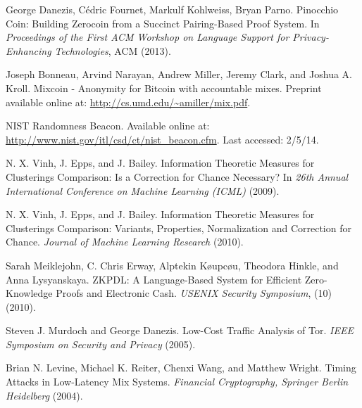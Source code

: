 \documentclass[conference]{IEEEtran}
\begin{document}
\begin{thebibliography}{1}
 George Danezis, C\'{e}dric Fournet, Markulf Kohlweiss, Bryan Parno. Pinocchio Coin: Building Zerocoin from a Succinct Pairing-Based Proof System. In \emph{Proceedings of the First ACM Workshop on Language Support for Privacy-Enhancing Technologies}, ACM (2013).

 Joseph Bonneau, Arvind Narayan, Andrew Miller, Jeremy Clark, and Joshua A. Kroll. Mixcoin - Anonymity for Bitcoin with accountable mixes. Preprint available online at: \url{http://cs.umd.edu/~amiller/mix.pdf}.

 NIST Randomness Beacon. Available online at: \url{http://www.nist.gov/itl/csd/ct/nist_beacon.cfm}. Last accessed: 2/5/14.

 N. X. Vinh, J. Epps, and J. Bailey. Information Theoretic Measures for Clusterings Comparison: Is a Correction for Chance Necessary? In \emph{26th Annual International Conference on Machine Learning (ICML)} (2009).

 N. X. Vinh, J. Epps, and J. Bailey. Information Theoretic Measures for Clusterings Comparison: Variants, Properties, Normalization and Correction for Chance. \emph{Journal of Machine Learning Research} (2010).

 Sarah Meiklejohn, C. Chris Erway, Alptekin K\o{u}pc\o{u}, Theodora Hinkle, and Anna Lysyanskaya. ZKPDL: A Language-Based System for Efficient Zero-Knowledge Proofs and Electronic Cash. \emph{USENIX Security Symposium}, (10) (2010).

 Steven J. Murdoch and George Danezis. Low-Cost Traffic Analysis of Tor. \emph{IEEE Symposium on Security and Privacy} (2005).

 Brian N. Levine, Michael K. Reiter, Chenxi Wang, and Matthew Wright. Timing Attacks in Low-Latency Mix Systems. \emph{Financial Cryptography, Springer Berlin Heidelberg} (2004).

\end{thebibliography}




\end{document}
